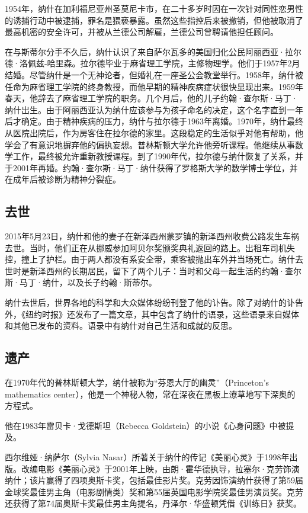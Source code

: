 1954年，纳什在加利福尼亚州圣莫尼卡市，在二十多岁时因在一次针对同性恋男性的诱捕行动中被逮捕，罪名是猥亵暴露。虽然这些指控后来被撤销，但他被取消了最高机密的安全许可，并被从兰德公司解雇，兰德公司曾聘请他担任顾问。

在与斯蒂尔分手不久后，纳什认识了来自萨尔瓦多的美国归化公民阿丽西亚·拉尔德·洛佩兹-哈里森。拉尔德毕业于麻省理工学院，主修物理学。他们于1957年2月结婚。尽管纳什是一个无神论者，但婚礼在一座圣公会教堂举行。1958年，纳什被任命为麻省理工学院的终身教授，而他早期的精神疾病症状很快显现出来。1959年春天，他辞去了麻省理工学院的职务。几个月后，他的儿子约翰·查尔斯·马丁·纳什出生。由于阿丽西亚认为纳什应该参与为孩子命名的决定，这个名字直到一年后才确定。由于精神疾病的压力，纳什与拉尔德于1963年离婚。1970年，纳什最终从医院出院后，作为房客住在拉尔德的家里。这段稳定的生活似乎对他有帮助，他学会了有意识地摒弃他的偏执妄想。普林斯顿大学允许他旁听课程。他继续从事数学工作，最终被允许重新教授课程。到了1990年代，拉尔德与纳什恢复了关系，并于2001年再婚。约翰·查尔斯·马丁·纳什获得了罗格斯大学的数学博士学位，并在成年后被诊断为精神分裂症。
\subsection{去世}  
2015年5月23日，纳什和他的妻子在新泽西州蒙罗镇的新泽西州收费公路发生车祸去世。当时，他们正在从挪威参加阿贝尔奖颁奖典礼返回的路上。出租车司机失控，撞上了护栏。由于两人都没有系安全带，乘客被抛出车外并当场死亡。纳什去世时是新泽西州的长期居民，留下了两个儿子：当时和父母一起生活的约翰·查尔斯·马丁·纳什，以及长子约翰·斯蒂尔。

纳什去世后，世界各地的科学和大众媒体纷纷刊登了他的讣告。除了对纳什的讣告外，《纽约时报》还发布了一篇文章，其中包含了纳什的语录，这些语录来自媒体和其他已发布的资料。语录中有纳什对自己生活和成就的反思。
\subsection{遗产}  
在1970年代的普林斯顿大学，纳什被称为“芬恩大厅的幽灵”（Princeton's mathematics center），他是一个神秘人物，常在深夜在黑板上潦草地写下深奥的方程式。

他在1983年雷贝卡·戈德斯坦（Rebecca Goldstein）的小说《心身问题》中被提及。

西尔维娅·纳萨尔（Sylvia Nasar）所著关于纳什的传记《美丽心灵》于1998年出版。改编电影《美丽心灵》于2001年上映，由朗·霍华德执导，拉塞尔·克劳饰演纳什；该片赢得了四项奥斯卡奖，包括最佳影片奖。克劳因饰演纳什获得了第59届金球奖最佳男主角（电影剧情类）奖和第55届英国电影学院奖最佳男演员奖。克劳还获得了第74届奥斯卡奖最佳男主角提名，丹泽尔·华盛顿凭借《训练日》获奖。

